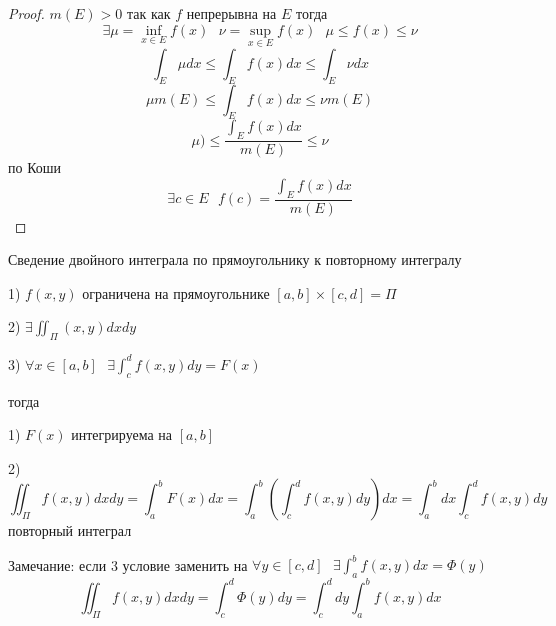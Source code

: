 \begin{proof}
  $m(E) > 0$ так как $f$ непрерывна на $E$ тогда
  $$
  \exists \mu = \inf \limits_{x \in E} f(x) ~~~ \nu = \sup \limits_{x \in E}
  f(x) ~~~ \mu \le f(x) \le \nu
  $$
  $$
  \int_E \mu dx \le \int_E f(x) dx \le \int_E \nu dx
  $$
  $$
  \mu m(E) \le \int_E f(x) dx \le \nu m(E)
  $$
  $$
  \mu) \le \frac{\int_E f(x)dx}{m(E)} \le \nu
  $$
  по Коши
  $$
  \exists c \in E ~~~ f(c) = \frac{\int_E f(x)dx}{m(E)}
  $$
\end{proof}

\begin{title}[\Large]
  Сведение двойного интеграла по прямоугольнику к повторному интегралу
\end{title}

\begin{theorem}
  1) $f(x, y)$ ограничена на прямоугольнике $[a,b] \times [c,d] = \Pi$

  2) $\exists \iint_{\Pi} (x,y)dxdy$

  3) $\forall x \in [a,b] ~~~ \exists \int_c^d f(x,y) dy = F(x)$

  тогда

  1) $F(x)$ интегрируема на $[a,b]$

  2)
  $$
  \iint_{\Pi} f(x, y) dxdy = \int_a^b F(x)dx = \int_a^b \left( \int_c^d f(x,y)
  dy \right)dx = \int_a^b dx \int_c^d f(x,y) dy
  $$
  повторный интеграл

  Замечание: если 3 условие заменить на
  $\forall y \in [c,d] ~~~ \exists \int_a^b f(x,y) dx = \Phi(y)$
  $$
  \iint_{\Pi} f(x, y) dxdy = \int_c^d \Phi(y)dy = \int_c^d dy \int_a^b f(x,y) dx
  $$
\end{theorem}

